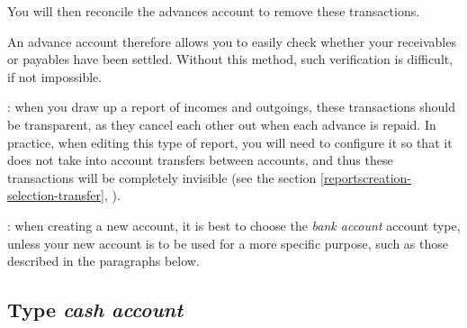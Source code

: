 You will then reconcile the advances account to remove these transactions.

An advance account therefore allows you to easily check whether your receivables or payables have been settled. Without this method, such verification is difficult, if not impossible.

\Note{}: when you draw up a report of incomes and outgoings, these transactions should be transparent, as they cancel each other out when each advance is repaid. In practice, when editing this type of report, you will need to configure it so that it does not take into account transfers between accounts, and thus these transactions will be completely invisible (see the section \vref{reportscreation-selection-transfer}, ).

\Note{}: when creating a new account, it is best to choose the \emph{bank account} account type, unless your new account is to be used for a more specific purpose, such as those described in the paragraphs below.


\subsection{Type \emph{cash account}\label{accounts-type-cash}}

